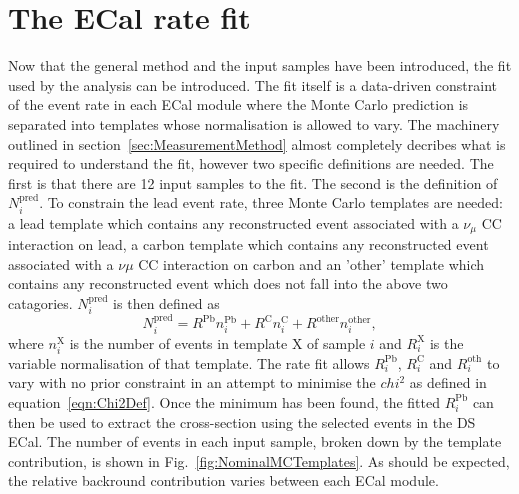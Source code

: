 \section{The ECal rate fit}
\label{sec:ECalRateFit}
Now that the general method and the input samples have been introduced, the fit used by the analysis can be introduced.  The fit itself is a data-driven constraint of the event rate in each ECal module where the Monte Carlo prediction is separated into templates whose normalisation is allowed to vary.  The machinery outlined in section~\ref{sec:MeasurementMethod} almost completely decribes what is required to understand the fit, however two specific definitions are needed.  The first is that there are 12 input samples to the fit.  The second is the definition of $N^{\textrm{pred}}_i$.  To constrain the lead event rate, three Monte Carlo templates are needed: a lead template which contains any reconstructed event associated with a $\nu_\mu$ CC interaction on lead, a carbon template which contains any reconstructed event associated with a $\nu\mu$ CC interaction on carbon and an 'other' template which contains any reconstructed event which does not fall into the above two catagories.  $N^{\textrm{pred}}_i$ is then defined as 
\begin{equation}
  N^{\textrm{pred}}_i = R^{\textrm{Pb}}n^{\textrm{Pb}}_i + R^{\textrm{C}}n^{\textrm{C}}_i + R^{\textrm{other}}n^{\textrm{other}}_i,
  \label{eqn:ECalFitPredDef}
\end{equation}
where $n^{\textrm{X}}_i$ is the number of events in template X of sample $i$ and $R^{\textrm{X}}_i$ is the variable normalisation of that template.
\newline
\newline
The rate fit allows $R^{\textrm{Pb}}_i$, $R^{\textrm{C}}_i$ and $R^{\textrm{oth}}_i$ to vary with no prior constraint in an attempt to minimise the $chi^{2}$ as defined in equation~\ref{eqn:Chi2Def}.  Once the minimum has been found, the fitted $R^{\textrm{Pb}}_i$ can then be used to extract the cross-section using the selected events in the DS ECal.  
\newline
\newline
The number of events in each input sample, broken down by the template contribution, is shown in Fig.~\ref{fig:NominalMCTemplates}.  As should be expected, the relative backround contribution varies between each ECal module.
